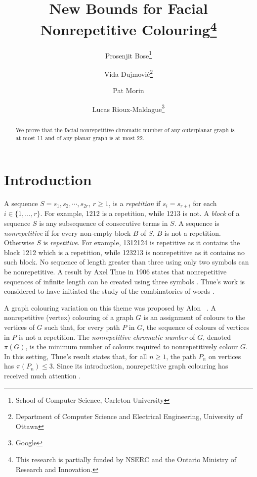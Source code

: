 \documentclass{cccg16}
\title{New Bounds for Facial Nonrepetitive Colouring\thanks{This research is partially funded by NSERC and the Ontario Ministry of Research and Innovation.}}
\author{Prosenjit Bose\thanks{School of Computer Science, Carleton University}
  \and Vida Dujmovi\'c\thanks{Department of Computer Science and Electrical Engineering, University of Ottawa}
  \and Pat Morin\footnotemark[2]
  \and Lucas Rioux-Maldague\thanks{Google}}
\begin{document}
\maketitle


\begin{abstract}
  We prove that the facial nonrepetitive chromatic number of any outerplanar graph is at most 11 and of any planar graph is at most 22.
\end{abstract}


\section{Introduction}

A sequence $S=s_1,s_2,\cdots,s_{2r}$, $r\ge 1$, is a \emph{repetition}
if $s_i=s_{r+i}$ for each $i\in\{1,\ldots,r\}$. For example, 1212
is a repetition, while 1213 is not. A \emph{block} of a sequence
$S$ is any subsequence of consecutive terms in $S$. A sequence
is \emph{nonrepetitive} if for every non-empty block $B$ of $S$,
$B$ is not a repetition. Otherwise $S$ is \emph{repetitive}. For
example, 1312124 is repetitive as it contains the block 1212 which is a
repetition, while 123213 is nonrepetitive as it contains no such block.
No sequence of length greater than three using only two symbols can be
nonrepetitive. A result by Axel Thue in 1906 states that nonrepetitive
sequences of infinite length can be created using three symbols
\cite{thue1906uber}. Thue's work is considered to have initiated the
study of the combinatorics of words \cite{allouche1999ubiquitous}.

A graph colouring variation on this theme was proposed by Alon
\etal\ \cite{alon2002nonrepetitive}.  A nonrepetitive (vertex) colouring
of a graph $G$ is an assignment of colours to the vertices of $G$ such
that, for every path $P$ in $G$, the sequence of colours of vertices
in $P$ is not a repetition.  The \emph{nonrepetitive chromatic number}
of $G$, denoted $\pi(G)$, is the minimum number of colours required to
nonrepetitively colour $G$.  In this setting, Thue's result states that,
for all $n\ge 1$, the path $P_n$ on vertices has $\pi(P_n)\le 3$.
Since its introduction, nonrepetitive
graph colouring has received much attention \cite{barat2013facial,
barat2007square, barat2008note, brevsar2007nonrepetitive,
currie2002cycle18, dujmovic2012planarlogn, dujmovic2011nonrepetitive,
fiorenzi2011thue, gagol2016pathwidth, gonccalves2014entropy,
grytczuk2007nonrepetitivesurvey, grytczuk2007nonrepetitive,
grytczuk2013new, harant2012nonrepetitive, kozik2013nonrepetitive,
kundgen2008nonrepetitive, pezarski2009non, przybylo2013facial,
schreyer2012facial, schreyer2013total}.
\end{document}

